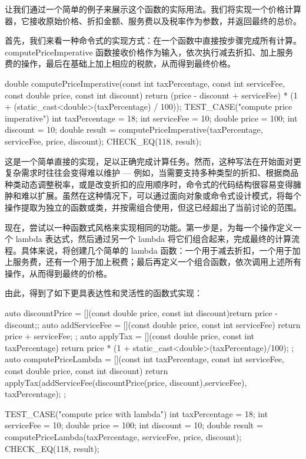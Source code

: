 让我们通过一个简单的例子来展示这个函数的实际用法。我们将实现一个价格计算器，它接收原始价格、折扣金额、服务费以及税率作为参数，并返回最终的总价。

首先，我们来看一种命令式的实现方式：在一个函数中直接按步骤完成所有计算。computePriceImperative 函数接收价格作为输入，依次执行减去折扣、加上服务费的操作，最后在基础上加上相应的税款，从而得到最终价格。

\begin{cpp}
double computePriceImperative(const int taxPercentage, const int
serviceFee, const double price, const int discount){
  return (price - discount + serviceFee) * (1 + (static_cast<double>(taxPercentage) / 100));
}
TEST_CASE("compute price imperative"){
  int taxPercentage = 18;
  int serviceFee = 10;
  double price = 100;
  int discount = 10;
  double result =
  computePriceImperative(taxPercentage, serviceFee, price, discount);
  CHECK_EQ(118, result);
}
\end{cpp}

这是一个简单直接的实现，足以正确完成计算任务。然而，这种写法在开始面对更复杂需求时往往会变得难以维护 --- 例如，当需要支持多种类型的折扣、根据商品种类动态调整税率，或是改变折扣的应用顺序时，命令式的代码结构很容易变得臃肿和难以扩展。虽然在这种情况下，可以通过面向对象或命令式设计模式，将每个操作提取为独立的函数或类，并按需组合使用，但这已经超出了当前讨论的范围。

现在，尝试以一种函数式风格来实现相同的功能。第一步是，为每一个操作定义一个 lambda 表达式，然后通过另一个 lambda 将它们组合起来，完成最终的计算流程。具体来说，将创建几个简单的 lambda 函数：一个用于减去折扣，一个用于加上服务费，还有一个用于加上税费；最后再定义一个组合函数，依次调用上述所有操作，从而得到最终的价格。

由此，得到了如下更具表达性和灵活性的函数式实现：

\begin{cpp}
auto discountPrice = [](const double price, const int discount){return
price - discount;};
auto addServiceFee = [](const double price, const int serviceFee){
return price + serviceFee; };
auto applyTax = [](const double price, const int taxPercentage){
return price * (1 + static_cast<double>(taxPercentage)/100); };
auto computePriceLambda = [](const int taxPercentage, const int
serviceFee, const double price, const int discount){
  return applyTax(addServiceFee(discountPrice(price, discount),serviceFee), taxPercentage);
};

TEST_CASE("compute price with lambda"){
  int taxPercentage = 18;
  int serviceFee = 10;
  double price = 100;
  int discount = 10;
  double result = computePriceLambda(taxPercentage, serviceFee, price,
  discount);
  CHECK_EQ(118, result);
}
\end{cpp}

